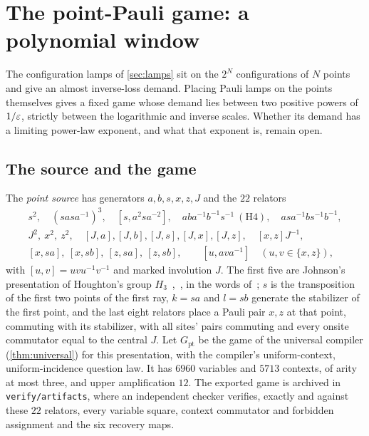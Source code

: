 \section{The point-Pauli game: a polynomial window}\label{sec:point}

The configuration lamps of \cref{sec:lamps} sit on the $2^N$ configurations of $N$ points and give an almost inverse-loss
demand. Placing Pauli lamps on the points themselves gives a fixed game whose demand lies between two positive powers of $1/\varepsilon$,
strictly between the logarithmic and inverse scales. Whether its demand has a limiting power-law exponent, and what that exponent is,
remain open.

\subsection{The source and the game}\label{sec:point-source}

The \emph{point source} has generators $a,b,s,x,z,J$ and the $22$ relators
\begin{gather*}
s^2,\quad(sas a^{-1})^3,\quad[s,a^2sa^{-2}],\quad aba^{-1}b^{-1}s^{-1}\ (\mathrm{H4}),\quad asa^{-1}bs^{-1}b^{-1},\\
J^2,\ x^2,\ z^2,\quad[J,a],[J,b],[J,s],[J,x],[J,z],\quad[x,z]J^{-1},\\
[x,sa],\ [x,sb],\ [z,sa],\ [z,sb],\qquad[u,ava^{-1}]\quad(u,v\in\{x,z\}),
\end{gather*}
with $[u,v]=uvu^{-1}v^{-1}$ and marked involution $J$. The first five are Johnson's presentation of Houghton's group
$H_3$~\cite{Joh99},~\cite[Theorem~2.8]{Lee12}, in the words of~\cite[(1)]{DM-H3}; $s$ is the transposition of the first two points of
the first ray, $k=sa$ and $l=sb$ generate the stabilizer of the first point, and the last eight relators place a Pauli pair
$x,z$ at that point, commuting with its stabilizer, with all sites' pairs commuting and every onsite commutator equal to the
central $J$. Let $G_{\mathrm{pt}}$ be the game of the universal compiler (\cref{thm:universal}) for this presentation, with the
compiler's uniform-context, uniform-incidence question law. It has $6960$ variables and $5713$ contexts, of arity at most three,
and upper amplification $12$. The exported game is archived in \texttt{verify/artifacts}, where an independent checker verifies,
exactly and against these $22$ relators, every variable square, context commutator and forbidden assignment and the six
recovery maps.

